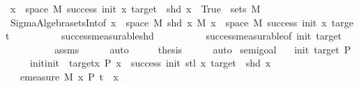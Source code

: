 \begin{isabellebody}
\ {\isachardoublequoteopen}{\isacharbraceleft}{\kern0pt}x\ {\isasymin}\ space\ M{\isachardot}{\kern0pt}\ success\ init\ x\ target\ {\isasymand}\ shd\ x\ {\isacharequal}{\kern0pt}\ True{\isacharbraceright}{\kern0pt}\ {\isasymin}\ sets\ M{\isachardoublequoteclose}\isanewline
\ \ \ \ \isamarkupfalse%
\ Sigma{\isacharunderscore}{\kern0pt}Algebra{\isachardot}{\kern0pt}sets{\isachardot}{\kern0pt}Int{\isacharbrackleft}{\kern0pt}of\ {\isachardoublequoteopen}{\isacharbraceleft}{\kern0pt}x\ {\isasymin}\ space\ M{\isachardot}{\kern0pt}\ shd\ x{\isacharbraceright}{\kern0pt}{\isachardoublequoteclose}\ M\ {\isachardoublequoteopen}{\isacharbraceleft}{\kern0pt}x\ {\isasymin}\ space\ M{\isachardot}{\kern0pt}\ success\ init\ x\ target{\isacharbraceright}{\kern0pt}{\isachardoublequoteclose}{\isacharbrackright}{\kern0pt}\isanewline
\ \ \ \ \ \ \ \ \ \ success{\isacharunderscore}{\kern0pt}measurable{\isacharunderscore}{\kern0pt}shd\isanewline
\ \ \ \ \ \ \ \ \ \ success{\isacharunderscore}{\kern0pt}measurable{\isacharbrackleft}{\kern0pt}of\ init\ target{\isacharbrackright}{\kern0pt}\isanewline
\ \ \ \ \ \ \ \ \ \ assms\isanewline
\ \ \ \ \isamarkupfalse%
\ auto\isanewline
\ \ \isamarkupfalse%
\ \isamarkupfalse%
\ {\isacharquery}{\kern0pt}thesis\isanewline
\ \ \ \ \isamarkupfalse%
\ auto\isanewline
{}\isamarkupfalse%
%
\endisatagproof
{\isafoldproof}%
%
\isadelimproof
%
\endisadelimproof
%
\isadelimdocument
%
\endisadelimdocument
%
\isatagdocument
%
\isamarkuptrue%
%
\endisatagdocument
{\isafolddocument}%
%
\isadelimdocument
%
\endisadelimdocument
{}\isamarkupfalse%
\ semi{\isacharunderscore}{\kern0pt}goal{}{\isacharcolon}{\kern0pt}\isanewline
\ \ \ init\ target\ P\isanewline
\ \ \ {\isachardoublequoteopen}{}\ {\isacharless}{\kern0pt}\ init{\isachardoublequoteclose}{\isachardoublequoteopen}init\ {\isasymle}\ target{\isachardoublequoteclose}{\isachardoublequoteopen}{\isasymAnd}x{\isachardot}{\kern0pt}\ P\ x\ {\isacharequal}{\kern0pt}\ success\ {\isacharparenleft}{\kern0pt}init{\isacharplus}{\kern0pt}{}{\isacharparenright}{\kern0pt}\ {\isacharparenleft}{\kern0pt}stl\ x{\isacharparenright}{\kern0pt}\ target\ {\isasymand}\ shd\ x{\isachardoublequoteclose}\isanewline
\ \ \ {\isachardoublequoteopen}emeasure\ M\ {\isacharbraceleft}{\kern0pt}x{\isachardot}{\kern0pt}\ P\ {\isacharparenleft}{\kern0pt}t\ {\isacharhash}{\kern0pt}{\isacharhash}{\kern0pt}\ x{\isacharparenright}{\kern0pt}{\isacharbraceright}{\kern0pt}\ \isanewline

\end{isabellebody}
